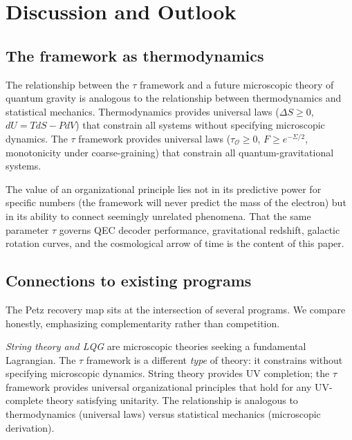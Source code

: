 \documentclass[prd,twocolumn,superscriptaddress,longbibliography,floatfix]{revtex4-2}
\newcommand{\tauasym}{\tau}
\newcommand{\tauO}{\tauasym_{\mathcal{O}}}
\begin{document}
\section{Discussion and Outlook}
\label{sec:discussion}

\subsection{The framework as thermodynamics}

The relationship between the $\tauasym$ framework and
a future microscopic theory of quantum gravity is
analogous to the relationship between thermodynamics
and statistical mechanics.  Thermodynamics provides
universal laws ($\Delta S \geq 0$,
$dU = TdS - PdV$) that constrain all systems without
specifying microscopic dynamics.  The $\tauasym$
framework provides universal laws
($\tauO \geq 0$, $F \geq e^{-\Sigma/2}$,
monotonicity under coarse-graining) that constrain
all quantum-gravitational systems.

The value of an organizational principle lies not in
its predictive power for specific numbers (the
framework will never predict the mass of the electron)
but in its ability to connect seemingly unrelated
phenomena.  That the same parameter $\tauasym$ governs
QEC decoder performance, gravitational redshift,
galactic rotation curves, and the cosmological arrow
of time is the content of this paper.

\subsection{Connections to existing programs}

The Petz recovery map sits at the intersection of
several programs.  We compare honestly, emphasizing
complementarity rather than competition.

\emph{String theory and LQG} are microscopic theories
seeking a fundamental Lagrangian.  The $\tauasym$
framework is a different \emph{type} of theory: it
constrains without specifying microscopic dynamics.
String theory provides UV completion; the $\tauasym$
framework provides universal organizational principles
that hold for any UV-complete theory satisfying
unitarity.  The relationship is analogous to
thermodynamics (universal laws) versus statistical
mechanics (microscopic derivation).
\end{document}
